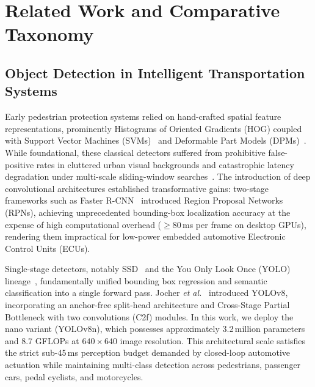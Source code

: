 \documentclass[3p,twocolumn]{elsarticle}
\newcommand{\etal}{\textit{et al.}}
\begin{document}
\section{Related Work and Comparative Taxonomy}
\label{sec:related}

\subsection{Object Detection in Intelligent Transportation Systems}
Early pedestrian protection systems relied on hand-crafted spatial feature representations, prominently Histograms of Oriented Gradients (HOG) coupled with Support Vector Machines (SVMs)~\cite{dalal2005} and Deformable Part Models (DPMs)~\cite{felz2010}. While foundational, these classical detectors suffered from prohibitive false-positive rates in cluttered urban visual backgrounds and catastrophic latency degradation under multi-scale sliding-window searches~\cite{geronimo2010}. The introduction of deep convolutional architectures established transformative gains: two-stage frameworks such as Faster R-CNN~\cite{ren2017} introduced Region Proposal Networks (RPNs), achieving unprecedented bounding-box localization accuracy at the expense of high computational overhead ($\ge 80$\,ms per frame on desktop GPUs), rendering them impractical for low-power embedded automotive Electronic Control Units (ECUs).

Single-stage detectors, notably SSD~\cite{liu2016ssd} and the You Only Look Once (YOLO) lineage~\cite{redmon2018}, fundamentally unified bounding box regression and semantic classification into a single forward pass. Jocher \etal~\cite{jocher2023} introduced YOLOv8, incorporating an anchor-free split-head architecture and Cross-Stage Partial Bottleneck with two convolutions (C2f) modules. In this work, we deploy the nano variant (YOLOv8n), which possesses approximately 3.2\,million parameters and 8.7 GFLOPs at $640\times640$ image resolution. This architectural scale satisfies the strict sub-45\,ms perception budget demanded by closed-loop automotive actuation while maintaining multi-class detection across pedestrians, passenger cars, pedal cyclists, and motorcycles.
\end{document}
